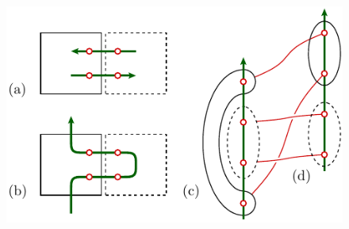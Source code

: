 \documentclass[aps, prl, letterpaper, twocolumn, superscriptaddress, notitlepage, 10pt]{revtex4-1}
\begin{document}
\begin{figure}[t!]
\begin{center}
	\includegraphics[width=0.8\columnwidth]{pic-syndrome.pdf} %

\end{center}
\end{figure}
\end{document}
